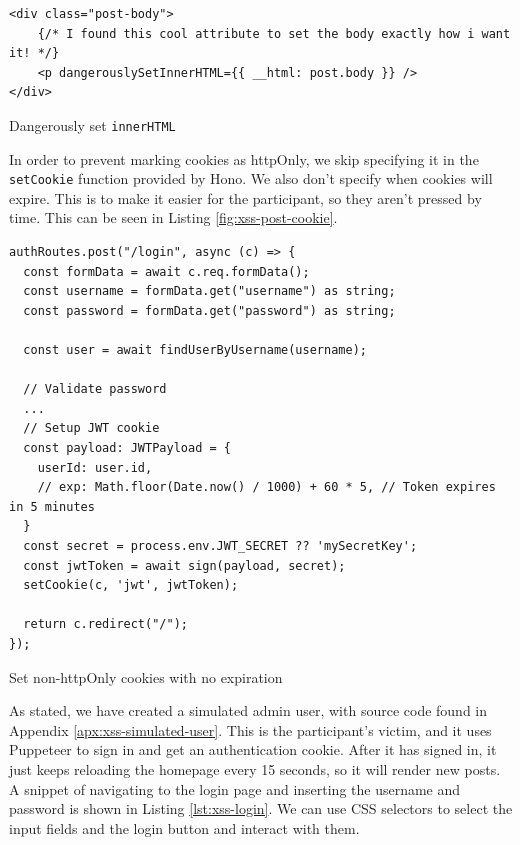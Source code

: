 \begin{listing}[H]
  \begin{verbatim}
<div class="post-body">
    {/* I found this cool attribute to set the body exactly how i want it! */}
    <p dangerouslySetInnerHTML={{ __html: post.body }} />
</div>
  \end{verbatim}
  \vspace{-1.5\baselineskip} %
 \caption{Dangerously set \texttt{innerHTML}}
\label{lst:xss-post-content-danger}
\end{listing}
\noindent
In order to prevent marking cookies as httpOnly, we skip specifying it in the \texttt{setCookie} function provided by Hono. We also don't specify when cookies will expire. This is to make it easier for the participant, so they aren't pressed by time. This can be seen in Listing \ref{fig:xss-post-cookie}.

\begin{listing}[H]
  \begin{verbatim}
authRoutes.post("/login", async (c) => {
  const formData = await c.req.formData();
  const username = formData.get("username") as string;
  const password = formData.get("password") as string;

  const user = await findUserByUsername(username);
    
  // Validate password
  ...
  // Setup JWT cookie
  const payload: JWTPayload = {
    userId: user.id,
    // exp: Math.floor(Date.now() / 1000) + 60 * 5, // Token expires in 5 minutes
  }
  const secret = process.env.JWT_SECRET ?? 'mySecretKey';
  const jwtToken = await sign(payload, secret);
  setCookie(c, 'jwt', jwtToken);

  return c.redirect("/");
});
  \end{verbatim}
  \vspace {-1.5\baselineskip} %
 \caption{Set non-httpOnly cookies with no expiration}
\label{fig:xss-post-cookie}
\end{listing}
\noindent
As stated, we have created a simulated admin user, with source code found in Appendix \ref{apx:xss-simulated-user}. This is the participant's victim, and it uses Puppeteer to sign in and get an authentication cookie. After it has signed in, it just keeps reloading the homepage every 15 seconds, so it will render new posts. A snippet of navigating to the login page and inserting the username and password is shown in Listing \ref{lst:xss-login}. We can use CSS selectors to select the input fields and the login button and interact with them.

